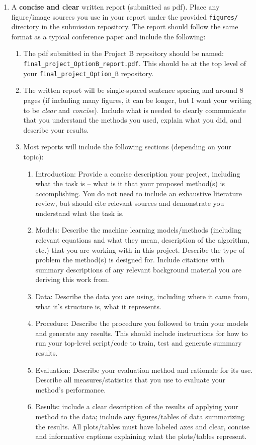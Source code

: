 \documentclass[10pt]{article}
\begin{document}
\begin{enumerate}
\item A {\bf concise and clear} written report (submitted as pdf). Place any figure/image sources you use in your report under the provided {\tt figures/} directory in the submission repository. The report should follow the same format as a typical conference paper and include the following:
\begin{enumerate}
\item The pdf submitted in the Project B repository should be named: {\tt final\_project\_OptionB\_report.pdf}. This should be at the top level of your {\tt final\_project\_Option\_B} repository.
\item The written report will be single-spaced sentence spacing and around 8 pages (if including many figures, it can be longer, but I want your writing to be {\em clear} and {\em concise}). Include what is needed to clearly communicate that you understand the methods you used, explain what you did, and describe your results.
\item Most reports will include the following sections (depending on your topic):
\begin{enumerate}
\item Introduction: Provide a concise description your project, including what the task is -- what is it that your proposed method(s) is accomplishing. You do not need to include an exhaustive literature review, but should cite relevant sources and demonstrate you understand what the task is. 
\item Models: Describe the machine learning models/methods (including relevant equations and what they mean, description of the algorithm, etc.) that you are working with in this project. Describe the type of problem the method(s) is designed for. Include citations with summary descriptions of any relevant background material you are deriving this work from. 
\item Data: Describe the data you are using, including where it came from, what it's structure is, what it represents.
\item Procedure: Describe the procedure you followed to train your models and generate any results. This should include instructions for how to run your top-level script/code to train, test and generate summary results.
\item Evaluation: Describe your evaluation method and rationale for its use. Describe all measures/statistics that you use to evaluate your method's performance.
\item Results: include a clear description of the results of applying your method to the data; include any figures/tables of data summarizing the results.  All plots/tables must have labeled axes and clear, concise and informative captions explaining what the plots/tables represent.
\end{enumerate}
\end{enumerate}
\end{enumerate}
\end{document}
